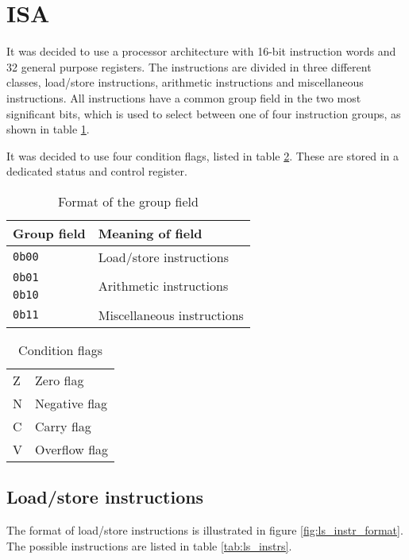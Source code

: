 
\section{ISA}

It was decided to use a processor architecture with 16-bit instruction words and 32 general purpose registers.
The instructions are divided in three different classes, load/store instructions, arithmetic instructions
and miscellaneous instructions. All instructions have a common group field in the two most significant bits,
which is used to select between one of four instruction groups, as shown in table \ref{tab:group_fmt}.

It was decided to use four condition flags, listed in table \ref{tab:condition_flags}. These are stored in
a dedicated status and control register.

\begin{table}[ht]
	\centering
	\begin{tabular}{|l l|}
		\hline
		\textbf{Group field} & \textbf{Meaning of field} \\
		\hline
		\texttt{0b00} & Load/store instructions \\
		\hline
		\texttt{0b01} & \multirow{2}{*}{Arithmetic instructions} \\
		\texttt{0b10} & \\
		\hline
		\texttt{0b11} & Miscellaneous instructions \\
		\hline
	\end{tabular}

	\label{tab:group_fmt}
	\caption{Format of the group field}
\end{table}

\begin{table}[ht]
	\centering
	\begin{tabular}{|l l|}
		\hline
		Z & Zero flag \\
		N & Negative flag \\
		C & Carry flag \\
		V & Overflow flag \\
		\hline
	\end{tabular}
	\label{tab:condition_flags}
	\caption{Condition flags}
\end{table}

\subsection{Load/store instructions}
The format of load/store instructions is illustrated in figure \ref{fig:ls_instr_format}. The possible
instructions are listed in table \ref{tab:ls_instrs}.

